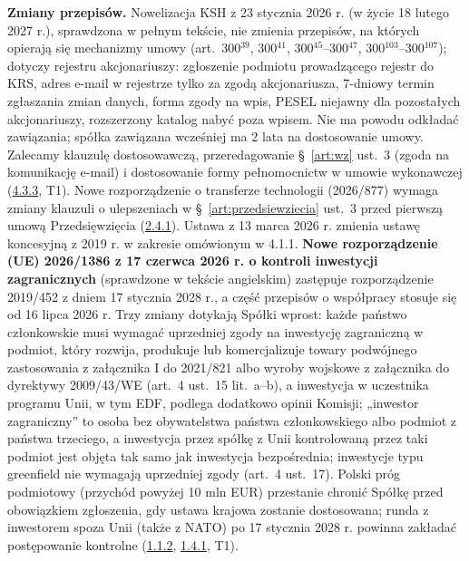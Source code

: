 \documentclass[12pt,a4paper]{report}
\begin{document}
\textbf{Zmiany przepisów.} Nowelizacja KSH z 23 stycznia 2026 r. (w życie 18 lutego 2027 r.), sprawdzona w pełnym tekście, nie zmienia przepisów, na których opierają się mechanizmy umowy (art.~300$^{39}$, 300$^{41}$, 300$^{45}$--300$^{47}$, 300$^{103}$--300$^{107}$); dotyczy rejestru akcjonariuszy: zgłoszenie podmiotu prowadzącego rejestr do KRS, adres e-mail w rejestrze tylko za zgodą akcjonariusza, 7-dniowy termin zgłaszania zmian danych, forma zgody na wpis, PESEL niejawny dla pozostałych akcjonariuszy, rozszerzony katalog nabyć poza wpisem. Nie ma powodu odkładać zawiązania; spółka zawiązana wcześniej ma 2 lata na dostosowanie umowy. Zalecamy klauzulę dostosowawczą, przeredagowanie §~\ref{art:wz} ust.~3 (zgoda na komunikację e-mail) i dostosowanie formy pełnomocnictw w umowie wykonawczej (\hyperref[memo:4.3.3]{4.3.3}, T1). Nowe rozporządzenie o transferze technologii (2026/877) wymaga zmiany klauzuli o ulepszeniach w §~\ref{art:przedsiewziecia} ust.~3 przed pierwszą umową Przedsięwzięcia (\hyperref[memo:2.4.1]{2.4.1}). Ustawa z 13 marca 2026 r. zmienia ustawę koncesyjną z 2019 r. w zakresie omówionym w 4.1.1. \textbf{Nowe rozporządzenie (UE) 2026/1386 z 17 czerwca 2026 r. o kontroli inwestycji zagranicznych} (sprawdzone w tekście angielskim) zastępuje rozporządzenie 2019/452 z dniem 17 stycznia 2028 r., a część przepisów o współpracy stosuje się od 16 lipca 2026 r. Trzy zmiany dotykają Spółki wprost: każde państwo członkowskie musi wymagać uprzedniej zgody na inwestycję zagraniczną w podmiot, który rozwija, produkuje lub komercjalizuje towary podwójnego zastosowania z załącznika I do 2021/821 albo wyroby wojskowe z załącznika do dyrektywy 2009/43/WE (art.~4 ust.~15 lit.~a--b), a inwestycja w uczestnika programu Unii, w tym EDF, podlega dodatkowo opinii Komisji; „inwestor zagraniczny” to osoba bez obywatelstwa państwa członkowskiego albo podmiot z państwa trzeciego, a inwestycja przez spółkę z Unii kontrolowaną przez taki podmiot jest objęta tak samo jak inwestycja bezpośrednia; inwestycje typu greenfield nie wymagają uprzedniej zgody (art.~4 ust.~17). Polski próg podmiotowy (przychód powyżej 10 mln EUR) przestanie chronić Spółkę przed obowiązkiem zgłoszenia, gdy ustawa krajowa zostanie dostosowana; runda z inwestorem spoza Unii (także z NATO) po 17 stycznia 2028 r. powinna zakładać postępowanie kontrolne (\hyperref[memo:1.1.2]{1.1.2}, \hyperref[memo:1.4.1]{1.4.1}, T1).
\end{document}
